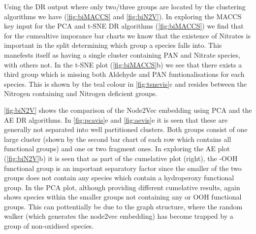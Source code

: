 Using the DR output where only two/three groups are located by the clustering algorithms we have (\autoref{fig:biMACCS} and \autoref{fig:biN2V}). In exploring the MACCS key input for the PCA and t-SNE DR algorithms (\autoref{fig:biMACCS}) we find that for the cumealtive imporance bar charts we know that the existence of Nitrates is important in the split determining which group a species falls into. This manefests itself as having a single cluster containing PAN and Nitrate species, with others not. In the t-SNE plot (\autoref{fig:biMACCS}b) we see that there exists a third group which is missing both Aldehyde and PAN funtionalisations for each species. This is shown by the teal colour in \autoref{fig:tsnevis}c and resides between the Nitrogen containing and Nitrogen deficient groups.

\autoref{fig:biN2V} shows the comparison of the Node2Vec embedding using PCA and the AE DR algorithms. In \autoref{fig:pcavis}e and \autoref{fig:aevis}e it is seen that these are generally not separated into well partitioned clusters. Both groups consist of one large cluster (shown by the second bar chart of each row which contains all functional groups) and one or two fragment ones. In exploring the AE plot (\autoref{fig:biN2V}b) it is seen that as part of the cumelative plot (right), the -OOH functional group is an important separatory factor since the smaller of the two groups does not contain any species which contain a hydroperoxy functional group. In the PCA plot, although providing different cumelative results, again shows species within the smaller groups not containing any  or OOH functional groups. This can pottentially be due to the graph structure, where the random walker (which generates the node2vec embedding) has become trapped by a group of non-oxidised species.


